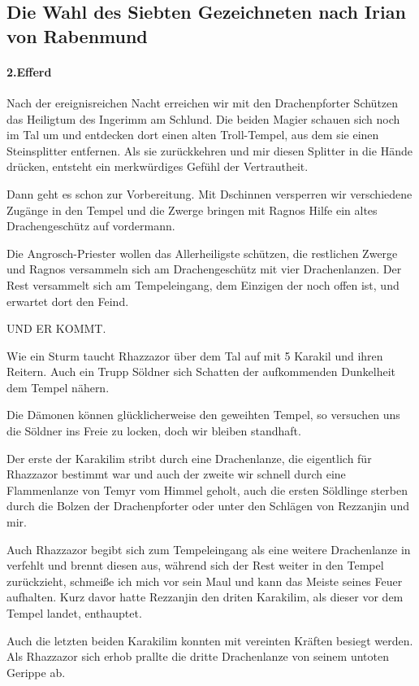 
\subsection{Die Wahl des Siebten Gezeichneten nach Irian von Rabenmund}
\paragraph{2.Efferd}
Nach der ereignisreichen Nacht erreichen wir mit den Drachenpforter Schützen das Heiligtum des Ingerimm am Schlund. Die beiden Magier schauen sich noch im Tal um und entdecken dort einen alten Troll-Tempel, aus dem sie einen Steinsplitter entfernen. Als sie zurückkehren und mir diesen Splitter in die Hände drücken, entsteht ein merkwürdiges Gefühl der Vertrautheit.

Dann geht es schon zur Vorbereitung. Mit Dschinnen versperren wir verschiedene Zugänge in den Tempel und die Zwerge bringen mit Ragnos Hilfe ein altes Drachengeschütz auf vordermann.

Die Angrosch-Priester wollen das Allerheiligste schützen, die restlichen Zwerge und Ragnos versammeln sich am Drachengeschütz mit vier Drachenlanzen. Der Rest versammelt sich am Tempeleingang, dem Einzigen der noch offen ist, und erwartet dort den Feind.

UND ER KOMMT.

Wie ein Sturm taucht Rhazzazor über dem Tal auf mit 5 Karakil und ihren Reitern. Auch ein Trupp Söldner sich Schatten der aufkommenden Dunkelheit dem Tempel nähern.

Die Dämonen können glücklicherweise den geweihten Tempel, so versuchen uns die Söldner ins Freie zu locken, doch wir bleiben standhaft.

Der erste der Karakilim stribt durch eine Drachenlanze, die eigentlich für Rhazzazor bestimmt war und auch der zweite wir schnell durch eine Flammenlanze von Temyr vom Himmel geholt, auch die ersten Söldlinge sterben durch die Bolzen der Drachenpforter oder unter den Schlägen von Rezzanjin und mir.

Auch Rhazzazor begibt sich zum Tempeleingang als eine weitere Drachenlanze in verfehlt und brennt diesen aus, während sich der Rest weiter in den Tempel zurückzieht, schmeiße ich mich vor sein Maul und kann das Meiste seines Feuer aufhalten. Kurz davor hatte Rezzanjin den driten Karakilim, als dieser vor dem Tempel landet, enthauptet.

Auch die letzten beiden Karakilim konnten mit vereinten Kräften besiegt werden. Als Rhazzazor sich erhob prallte die dritte Drachenlanze von seinem untoten Gerippe ab.

